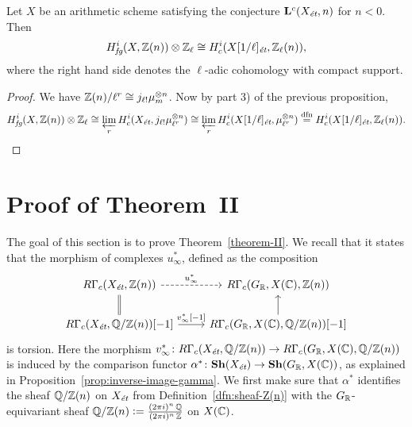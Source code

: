 \documentclass{article}
\numberwithin{equation}{section}
\begin{document}
\begin{corollary}
  Let $X$ be an arithmetic scheme satisfying the conjecture
  $\mathbf{L}^c (X_\et, n)$ for $n < 0$. Then
  $$H_\fg^i (X, \ZZ (n)) \otimes \ZZ_\ell \cong H^i_c (X [1/\ell]_\et, \ZZ_\ell (n)),$$
  where the right hand side denotes the $\ell$-adic cohomology with compact
  support.

  \begin{proof}
    We have $\ZZ (n)/\ell^r \cong j_{\ell!} \mu_m^{\otimes n}$.
    Now by part 3) of the previous proposition,
    \[ H_\fg^i (X, \ZZ (n)) \otimes \ZZ_\ell \cong
      \varprojlim_r H_c^i (X_\et, j_{\ell!} \mu_{\ell^r}^{\otimes n}) \cong
      \varprojlim_r H_c^i (X [1/\ell]_\et, \mu_{\ell^r}^{\otimes n})
      \stackrel{\text{dfn}}{=} H_c^i (X [1/\ell]_\et, \ZZ_\ell (n)). \qedhere \]
  \end{proof}
\end{corollary}


\section{Proof of Theorem~II}
\label{sec:theorem-II}

The goal of this section is to prove Theorem~\ref{theorem-II}. We recall that it
states that the morphism of complexes $u_\infty^*$, defined as the composition
\[ \begin{tikzcd}
  R\Gamma_c (X_\et, \ZZ(n)) \ar[equals]{d}\ar[dashed]{r}{u_\infty^*} & R\Gamma_c (G_\RR, X (\CC), \ZZ (n)) \\
  R\Gamma_c (X_\et, \QQ/\ZZ (n)) [-1] \ar{r}{v_\infty^* [-1]} & R\Gamma_c (G_\RR, X (\CC), \QQ/\ZZ (n)) [-1] \ar{u}
\end{tikzcd} \]
is torsion. Here the morphism
$v_\infty^*\colon R\Gamma_c (X_\et, \QQ/\ZZ (n)) \to R\Gamma_c (G_\RR, X (\CC), \QQ/\ZZ (n))$
is induced by the comparison functor
$\alpha^*\colon \mathbf{Sh} (X_\et) \to \mathbf{Sh} (G_\RR, X (\CC))$, as
explained in Proposition~\ref{prop:inverse-image-gamma}. We first make sure that
$\alpha^*$ identifies the sheaf $\QQ/\ZZ (n)$ on $X_\et$ from
Definition~\ref{dfn:sheaf-Z(n)} with the $G_\RR$-equivariant sheaf
$\QQ/\ZZ (n) \dfn \frac{(2\pi i)^n\,\QQ}{(2\pi i)^n\,\ZZ}$ on $X (\CC)$.
\end{document}
